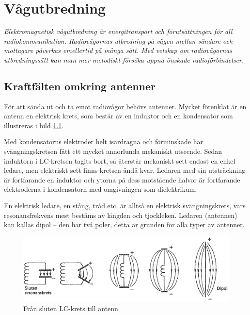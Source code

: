 \chapter{Vågutbredning}
\label{vågutbredning}

\emph{Elektromagnetisk vågutbredning är energitransport och
  förutsättningen för all radiokommunikation.
  Radiovågornas utbredning på vägen mellan sändare och mottagare påverkas
  emellertid på många sätt.
  Med vetskap om radiovågornas utbredningssätt kan man mer
  metodiskt försöka uppnå önskade radioförbindelser.}

\section[Kraftfält antenner]{Kraftfälten omkring antenner}

För att sända ut och ta emot radiovågor behövs antenner.
Mycket förenklat är en antenn en elektrisk krets, som består av en induktor
och en kondensator som illustreras i bild \ref{fig:BildII7-01}.

Med kondensatorns elektroder helt isärdragna och förminskade har
svängningskretsen fått ett mycket annorlunda mekaniskt utseende.
Sedan induktorn i LC-kretsen tagits bort, så återstår mekaniskt sett endast
en enkel ledare, men elektriskt sett finns kretsen ändå kvar.
Ledaren med sin utsträckning är fortfarande en induktor och ytorna på dess
motstående halvor är fortfarande elektroderna i kondensatorn med
omgivningen som dielektrikum.

En elektrisk ledare, en stång, tråd etc. är alltså en elektrisk
svängningskrets, vars resonansfrekvens mest bestäms av längden och
tjockleken. Ledaren (antennen) kan kallas dipol -- den har två poler,
detta är grunden för alla typer av antenner.

\begin{figure}
\includegraphics[width=\textwidth]{images/cropped_pdfs/bild_2_7-01.pdf}
\caption{Från sluten LC-krets till antenn}
\label{fig:BildII7-01}
\end{figure}

